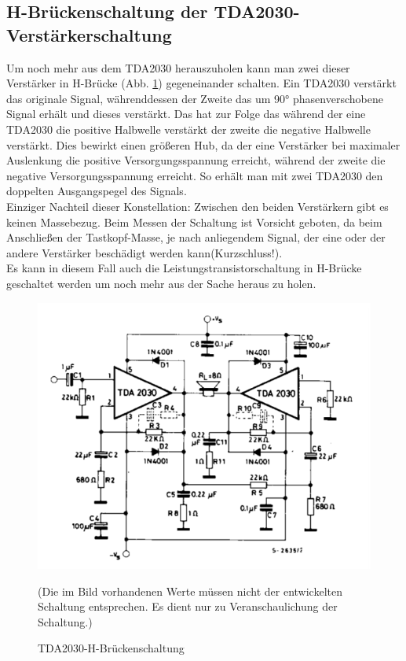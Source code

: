 \subsection{H-Brückenschaltung der TDA2030-Verstärkerschaltung}\label{subsec3.2.4}
Um noch mehr aus dem TDA2030 herauszuholen kann man zwei dieser Verstärker in H-Brücke (Abb. \ref{fig:3.2.4.1}) gegeneinander schalten.
Ein TDA2030 verstärkt das originale Signal, währenddessen der Zweite das um 90° phasenverschobene Signal erhält und dieses verstärkt.
Das hat zur Folge das während der eine TDA2030 die positive Halbwelle verstärkt der zweite die negative Halbwelle verstärkt.
Dies bewirkt einen größeren Hub, da der eine Verstärker bei maximaler Auslenkung die positive Versorgungsspannung erreicht, während der zweite die negative Versorgungsspannung erreicht.
So erhält man mit zwei TDA2030 den doppelten Ausgangspegel des Signals.\\
Einziger Nachteil dieser Konstellation: Zwischen den beiden Verstärkern gibt es keinen Massebezug.
Beim Messen der Schaltung ist Vorsicht geboten, da beim Anschließen der Tastkopf-Masse, je nach anliegendem Signal, der eine oder der andere Verstärker beschädigt werden kann(Kurzschluss!).\\
Es kann in diesem Fall auch die Leistungstransistorschaltung in H-Brücke geschaltet werden um noch mehr aus der Sache heraus zu holen.
\begin{figure} [H]
	\centering
	\includegraphics[width=1\textwidth]{img/Grundlagen/TDA2030/TDA2030-H-Bruecke.PNG}
	\caption[TDA2030-H-Brückenschaltung]{TDA2030-H-Brückenschaltung\footnotemark}
	\text (Die im Bild vorhandenen Werte müssen nicht der entwickelten Schaltung entsprechen. Es dient nur zu Veranschaulichung der Schaltung.)
	\label {fig:3.2.4.1}
\end{figure}

